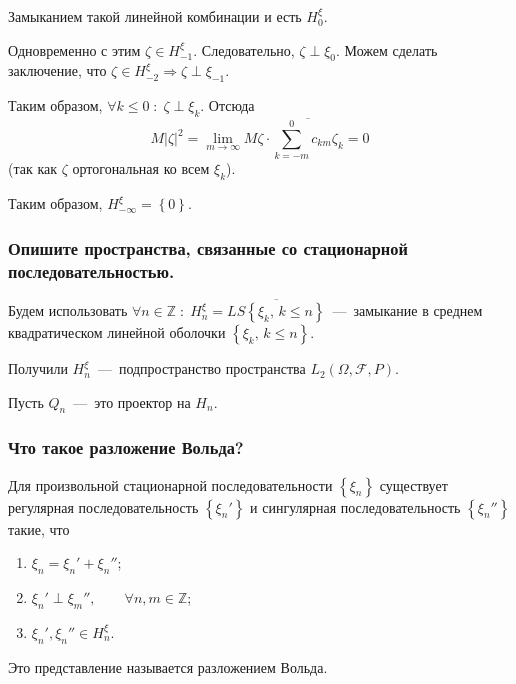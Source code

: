 \begin{enumerate}
  Замыканием такой линейной комбинации и есть $H_0^{ \xi }$.

  Одновременно с этим $ \zeta \in H_{-1}^{ \xi }$.
  Следовательно, $ \zeta \perp \xi_0$.
  Можем сделать заключение, что $ \zeta \in H_{-2}^{ \xi } \Rightarrow \zeta \perp \xi_{-1}$.

  Таким образом, $ \forall k \leq 0 \; : \; \zeta \perp \xi_k$.
  Отсюда
  \begin{equation*}
    M \left| \zeta \right|^2 =
    \lim \limits_{m \to \infty } M \zeta \cdot \overline{ \sum \limits_{k = -m}^0 c_{km} \zeta_k} =
    0
  \end{equation*}
  (так как $ \zeta $ ортогональная ко всем $ \xi_k$).

  Таким образом, $H_{-\infty }^{ \xi } = \left\{ 0 \right\} $.
\end{enumerate}

\subsubsection*{Опишите пространства, связанные со стационарной последовательностью.}

Будем использовать
$ \forall n \in \mathbb{Z} \; : \;
  H_n^{ \xi } = \overline{LS \left\{ \xi_k, \, k \leq n \right\} }$~---~замыкание
в среднем квадратическом линейной оболочки $ \left\{ \xi_k, \, k \leq n \right\} $.

Получили $H_n^{ \xi }$~---~подпространство пространства
$L_2 \left( \Omega, \mathcal{F}, P \right) $.

Пусть $Q_n$~---~это проектор на $H_n$.

\subsubsection*{Что такое разложение Вольда?}

Для произвольной стационарной последовательности $ \left\{ \xi_n \right\} $
существует регулярная последовательность $ \left\{ \xi_n' \right\} $
и сингулярная последовательность $ \left\{ \xi_n'' \right\} $ такие, что
\begin{enumerate}
  \item $ \xi_n = \xi_n' + \xi_n''$;
  \item $ \xi_n' \perp \xi_m'', \qquad \forall n, m \in \mathbb{Z}$;
  \item $ \xi_n', \xi_n'' \in H_n^{ \xi }$.
\end{enumerate}

Это представление называется разложением Вольда.


